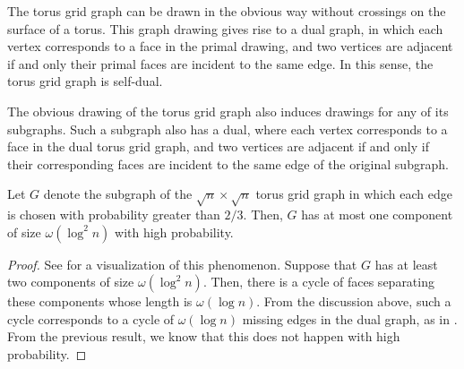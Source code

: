 \documentclass{patmorin}
\begin{document}
The torus grid graph can be drawn in the obvious way without crossings
on the surface of a torus. This graph drawing gives rise to a dual
graph, in which each vertex corresponds to a face in the primal
drawing, and two vertices are adjacent if and only their primal faces
are incident to the same edge. In this sense, the torus grid graph is
self-dual.

The obvious drawing of the torus grid graph also induces drawings for
any of its subgraphs. Such a subgraph also has a dual, where each
vertex corresponds to a face in the dual torus grid graph, and two
vertices are adjacent if and only if their corresponding faces are
incident to the same edge of the original subgraph.

\begin{thm}
  Let $G$ denote the subgraph of the $\sqrt{n} \times \sqrt{n}$ torus
  grid graph in which each edge is chosen with probability greater
  than $2/3$. Then, $G$ has at most one component of size
  $\omega(\log^2 n)$ with high probability.
\end{thm}
\begin{proof}
  See  for a visualization of this phenomenon. Suppose
  that $G$ has at least two components of size $\omega(\log^2
  n)$. Then, there is a cycle of faces separating these components
  whose length is $\omega(\log n)$. From the discussion above, such a
  cycle corresponds to a cycle of $\omega(\log n)$ missing edges in
  the dual graph, as in . From the previous
  result, we know that this does not happen with high probability.
\end{proof}
\end{document}
